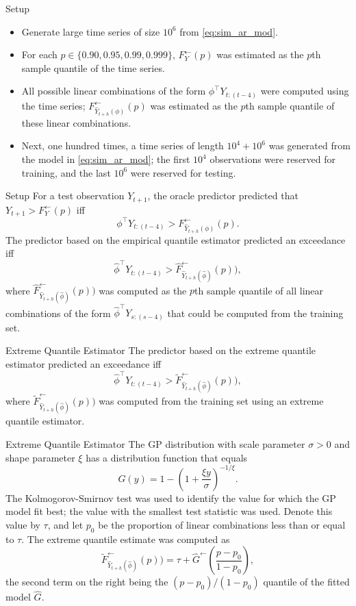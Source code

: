 \documentclass{beamer}
\newcommand\Fi[1]{F_{#1}^{\leftarrow}}
\newcommand{\AROptPred}[3]{\hat{Y}_{#1 + #2}(#3)}
\newcommand{\approxAROptPred}[3]{\hat{Y}_{#1 + #2}(\hat{#3})}
\begin{document}
\begin{frame}{Setup}
    \begin{itemize}
        \item Generate large time series of size $10^6$ from \eqref{eq:sim_ar_mod}.
        \item For each $p \in \{0.90, 0.95, 0.99, 0.999\}$, $\Fi{Y}(p)$ was estimated as the $p$th sample quantile of the time series.
        \item All possible linear combinations of the form $\phi^{\top}Y_{t:(t - 4)}$ were computed using the time series; $\Fi{\AROptPred{t}{h}{\phi}}(p)$ was estimated as the $p$th sample quantile of these linear combinations.
        \item Next, one hundred times, a time series of length $10^4 + 10^6$ was generated from the model in \eqref{eq:sim_ar_mod}; the first $10^4$ observations were reserved for training, and the last $10^6$ were reserved for testing.
    \end{itemize}
\end{frame}

\begin{frame}{Setup}
    For a test observation $Y_{t + 1}$, the oracle predictor predicted that $Y_{t + 1} > \Fi{Y}(p)$ iff 
    \[
    \phi^{\top}Y_{t:(t - 4)} > \Fi{\AROptPred{t}{h}{\phi}}(p).
    \]
    The predictor based on the empirical quantile estimator predicted an exceedance iff
    \[
    \widehat{\phi}^{\top}Y_{t:(t - 4)} > \widehat{F}_{\approxAROptPred{t}{h}{\phi}}^{\leftarrow}(p)),
    \]
    where $\widehat{F}_{\approxAROptPred{t}{h}{\phi}}^{\leftarrow}(p))$ was computed as the $p$th sample quantile of all linear combinations of the form $\widehat{\phi}^{\top}Y_{s:(s - 4)}$ that could be computed from the training set.
\end{frame}

\begin{frame}{Extreme Quantile Estimator}
    The predictor based on the extreme quantile estimator predicted an exceedance iff
    \[
    \widehat{\phi}^{\top}Y_{t:(t - 4)} > \widetilde{F}_{\approxAROptPred{t}{h}{\phi}}^{\leftarrow}(p)),
    \]
    where $\widetilde{F}_{\approxAROptPred{t}{h}{\phi}}^{\leftarrow}(p))$ was computed from the training set using an extreme quantile estimator.
\end{frame}

\begin{frame}{Extreme Quantile Estimator}
    The GP distribution with scale parameter $\sigma > 0$ and shape parameter $\xi$ has a distribution function that equals
    \[
    G(y) = 1 - \left(1 + \frac{\xi y}{\sigma}\right)^{-1 / \xi}.
    \]
    The Kolmogorov-Smirnov test was used to identify the value for which the GP model fit best; the value with the smallest test statistic was used. Denote this value by $\tau$, and let $p_0$ be the proportion of linear combinations less than or equal to $\tau$. The extreme quantile estimate was computed as
    \[
    \widetilde{F}_{\approxAROptPred{t}{h}{\phi}}^{\leftarrow}(p)) = \tau + \widehat{G}^{\leftarrow}\left(\frac{p - p_0}{1 - p_0}\right),
    \]
    the second term on the right being the $(p - p_0) / (1 - p_0)$ quantile of the fitted model $\widehat{G}$.
\end{frame}
\end{document}
